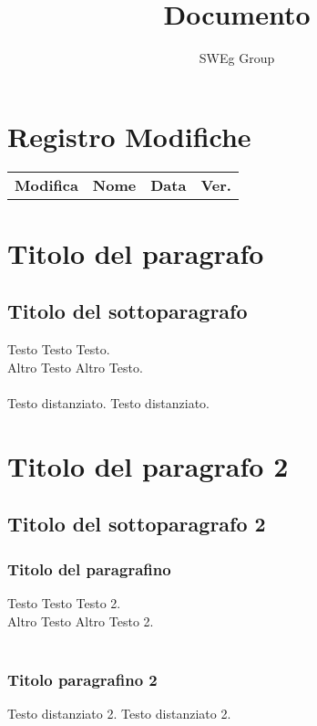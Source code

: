 \documentclass[12pt,a4paper,titlepage]{article}
\renewcommand{\headrulewidth}{0.4pt}
\renewcommand{\footrulewidth}{0.4pt}
\begin{document}
 

\title{Documento}
\author{SWEg Group}
\date{}
\maketitle

\chead{}
\cfoot{}
\rfoot{\thepage}
\renewcommand{\headrulewidth}{0.2pt}
\renewcommand{\footrulewidth}{0.2pt}

\section{Registro Modifiche}
\small %
{\renewcommand\arraystretch{1.2}  %
\begin{tabular}{|l|c|c|c|}
\hline
{\textbf{Modifica}}&{\textbf{Nome}}&{\textbf{Data}}&{\textbf{Ver.}}\\
\end{tabular}
}

\tableofcontents
\thispagestyle{empty}

\newpage


\section{Titolo del paragrafo}
\subsection{Titolo del sottoparagrafo}
Testo Testo Testo.\\
Altro Testo Altro Testo.\\
\\
Testo distanziato. Testo distanziato. 

\newpage

\section{Titolo del paragrafo 2}
\subsection{Titolo del sottoparagrafo 2}
\subsubsection{Titolo del paragrafino}
Testo Testo Testo 2.\\
Altro Testo Altro Testo 2.\\
\\
\subsubsection{Titolo paragrafino 2}
Testo distanziato 2. Testo distanziato 2. 
\end{document}
